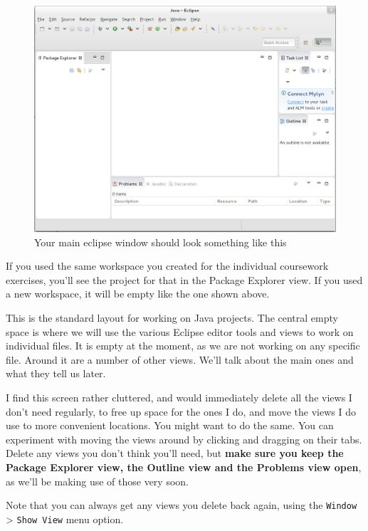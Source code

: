 \documentclass[
]{book}
\begin{document}
\begin{figure}

{\centering \includegraphics[width=1\linewidth]{images/1.3.2firstView} 

}

\caption{Your main eclipse window should look something like this}\label{fig:firstview-fig}
\end{figure}

If you used the same workspace you created for the individual coursework exercises, you'll see the project for that in the Package Explorer view. If you used a new workspace, it will be empty like the one shown above.

This is the standard layout for working on Java projects. The central empty space is where we will use the various Eclipse editor tools and views to work on individual files. It is empty at the moment, as we are not working on any specific file. Around it are a number of other views. We'll talk about the main ones and what they tell us later.

I find this screen rather cluttered, and would immediately delete all the views I don't need regularly, to free up space for the ones I do, and move the views I do use to more convenient locations. You might want to do the same. You can experiment with moving the views around by clicking and dragging on their tabs. Delete any views you don't think you'll need, but \textbf{make sure you keep the Package Explorer view, the Outline view and the Problems view open}, as we'll be making use of those very soon.

Note that you can always get any views you delete back again, using the \texttt{Window} \textgreater{} \texttt{Show\ View} menu option.
\end{document}
